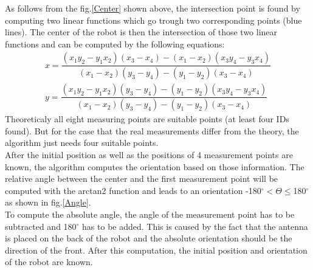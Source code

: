As follows from the fig.\ref{Center} shown above, the intersection point is found by computing two linear functions which go trough two corresponding points (blue lines). The center of the robot is then the intersection of those two linear functions and can be computed by the following equations:
\begin{align}
x = \dfrac{(x_1y_2-y_1x_2)(x_3-x_4)-(x_1-x_2)(x_3y_4-y_3x_4)}{(x_1-x_2)(y_3-y_4)-(y_1-y_2)(x_3-x_4)} \\
y = \dfrac{(x_1y_2-y_1x_2)(y_3-y_4)-(y_1-y_2)(x_3y_4-y_3x_4)}{(x_1-x_2)(y_3-y_4)-(y_1-y_2)(x_3-x_4)}
\end{align}
Theoreticaly all eight measuring points are suitable points (at least four IDs found). But for the case that the real measurements differ from the theory, the algorithm just needs four suitable points. \\
After the initial position as well as the positions of 4 measurement points are known, the algorithm computes the orientation based on those information. The relative angle between the center and the first measurement point will be computed with the arctan2 function and leads to an orientation -180$^\circ < \Theta \leq$180$^\circ$ as shown in fig.\ref{Angle}. \\
To compute the absolute angle, the angle of the measurement point has to be subtracted and 180$^\circ$ has to be added. This is caused by the fact that the antenna is placed on the back of the robot and the absolute orientation should be the direction of the front. After this computation, the initial position and orientation of the robot are known. \\

